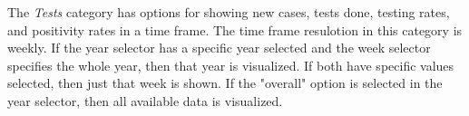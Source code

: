 \documentclass[pdftex, 11pt, a4paper]{article}
\begin{document}
    The \emph{Tests} category has options for showing new cases, tests done, testing rates,
    and positivity rates in a time frame. The time frame resulotion in this category is
    weekly. If the year selector has a specific year selected and the week selector specifies
    the whole year, then that year is visualized. If both have specific values selected,
    then just that week is shown. If the "overall" option is selected in the year selector,
    then all available data is visualized.
\end{document}
